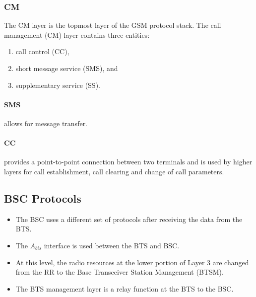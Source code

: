 \subsubsection*{CM}
The CM layer is the topmost layer of the GSM protocol stack. The call management (CM) layer contains three entities: 
\begin{multicols}{2}
	\begin{enumerate}
		\item call control (CC), 
		\item short message service (SMS), and 
		\item supplementary service (SS).
	\end{enumerate}
\end{multicols}

\paragraph*{SMS} allows for message transfer.

\paragraph*{CC} provides a point-to-point connection between two terminals and is used by higher layers for call establishment, call clearing and change of call parameters.

%

\subsection{BSC Protocols}
\begin{itemize}
	\item The BSC uses a different set of protocols after receiving the data from the BTS. 
	\item The \(A_{bis}\) interface is used between the BTS and BSC.
	\item At this level, the radio resources at the lower portion of Layer 3 are changed from the RR to the Base Transceiver Station Management (BTSM). 
	\item The BTS management layer is a relay function at the BTS to the BSC.
\end{itemize}

